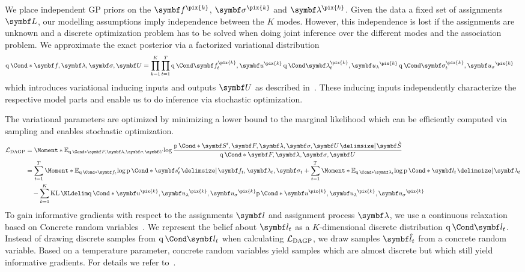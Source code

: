 We place independent GP priors on the $\mat{f}^{\pix{k}}$, $\mat{\sigma}^{\pix{k}}$ and $\mat{\lambda}^{\pix{k}}$.
Given the data a fixed set of assignments $\mat{L}$, our modelling assumptions imply independence between the $K$ modes.
However, this independence is lost if the assignments are unknown and a discrete optimization problem has to be solved when doing joint inference over the different modes and the association problem.
We approximate the exact posterior via a factorized variational distribution
\begin{align}
    \Variat*{\mat{f}, \mat{\lambda}, \mat{\sigma}, \mat{U}} & =
    \prod_{k=1}^K\prod_{t=1}^T \Variat{\mat{f}_t^{\pix{k}}, \mat{u}^{\pix{k}}} \Variat{\mat{\lambda}_t^{\pix{k}}, \mat{u_\lambda}^{\pix{k}}} \Variat{\mat{\sigma}_t^{\pix{k}}, \mat{u_\sigma}^{\pix{k}}}
\end{align}
which introduces variational inducing inputs and outputs $\mat{U}$ as described in~\parencite{damianou_deep_2013,hensman_scalable_2015,kaiser_data_2018}.
These inducing inputs independently characterize the respective model parts and enable us to do inference via stochastic optimization.

The variational parameters are optimized by minimizing a lower bound to the marginal likelihood which can be efficiently computed via sampling and enables stochastic optimization.
\begin{align}
    \begin{split}
        \label{eq:interpretable_reinforcement_learning:variational_bound}
        \Lc_{\text{DAGP}} &= \Moment*{\E_{\Variat*{\mat{F}, \mat{\lambda}, \mat{\sigma}, \mat{U}}}}{\log\frac{\Prob*{\mat{S}^\prime, \mat{F}, \mat{\lambda}, \mat{\sigma}, \mat{U} \given \mat{\hat{S}}}}{\Variat*{\mat{F}, \mat{\lambda}, \mat{\sigma}, \mat{U}}}} \\
        &=
        \sum_{t=1}^T \Moment*{\E_{\Variat*{\mat{f}_t}}}{\log \Prob*{\mat{s}^\prime_t \given \mat{f}_t, \mat{\lambda}_t, \mat{\sigma}_t}}
        + \sum_{t=1}^T \Moment*{\E_{\Variat*{\mat{\lambda}_t}}}{\log \Prob*{\mat{l}_t \given \mat{\lambda}_t}} \\
        &\quad
        - \sum_{k=1}^K \KL{\Variat*{\mat{u}^{\pix{k}}, \mat{u_\lambda}^{\pix{k}}, \mat{u_\sigma}^{\pix{k}}}}{\Prob*{\mat{u}^{\pix{k}}, \mat{u_\lambda}^{\pix{k}}, \mat{u_\sigma}^{\pix{k}}}}
    \end{split}
\end{align}
To gain informative gradients with respect to the assignments $\mat{l}$ and assignment process $\mat{\lambda}$, we use a continuous relaxation based on Concrete random variables~\parencite{maddison_concrete_2016}.
We represent the belief about $\mat{l}_t$ as a $K$-dimensional discrete distribution $\Variat{\mat{l}_t}$.
Instead of drawing discrete samples from $\Variat{\mat{l}_t}$ when calculating $\mathcal{L}_{\text{DAGP}}$, we draw samples $\mat{\hat{l}}_t$ from a concrete random variable.
Based on a temperature parameter, concrete random variables yield samples which are almost discrete but which still yield informative gradients.
For details we refer to~\parencite{kaiser_data_2018}.

